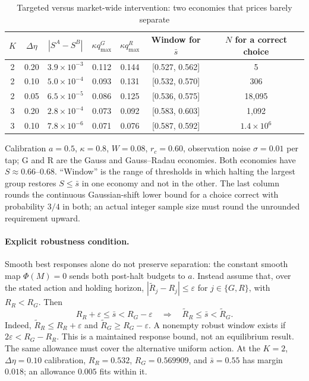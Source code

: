 \documentclass[12pt]{article}
\theoremstyle{definition}
\theoremstyle{remark}
\begin{document}
\begin{table}[!htbp]\centering\footnotesize
\begin{threeparttable}
\caption{Targeted versus market-wide intervention: two economies that prices barely separate}\label{tab:target}
\setlength{\tabcolsep}{3pt}
\begin{tabular}{ccccccc}
\toprule
$K$ & $\Delta\eta$ & $|S^A-S^B|$ & $\kappa q^{G}_{\max}$ & $\kappa q^{R}_{\max}$ & Window for $\bar s$ & $N$ for a correct choice\\
\midrule
2 & 0.20 & $3.9\times10^{-3}$ & 0.112 & 0.144 & [0.527, 0.562] & 5\\
2 & 0.10 & $5.0\times10^{-4}$ & 0.093 & 0.131 & [0.532, 0.570] & 306\\
2 & 0.05 & $6.5\times10^{-5}$ & 0.086 & 0.125 & [0.536, 0.575] & 18{,}095\\
3 & 0.20 & $2.8\times10^{-4}$ & 0.073 & 0.092 & [0.583, 0.603] & 1{,}092\\
3 & 0.10 & $7.8\times10^{-6}$ & 0.071 & 0.076 & [0.587, 0.592] & $1.4\times10^{6}$\\
\bottomrule
\end{tabular}
\begin{tablenotes}\footnotesize\item Calibration $a=0.5$, $\kappa=0.8$, $W=0.08$, $r_c=0.60$, observation noise $\sigma=0.01$ per tap; G and R are the Gauss and Gauss--Radau economies. Both economies have $S\approx0.66$--$0.68$. ``Window'' is the range of thresholds in which halting the largest group restores $S\le\bar s$ in one economy and not in the other. The last column rounds the continuous Gaussian-shift lower bound for a choice correct with probability $3/4$ in both; an actual integer sample size must round the unrounded requirement upward.\end{tablenotes}
\end{threeparttable}
\end{table}

\paragraph{Explicit robustness condition.} Smooth best responses alone do not preserve separation: the constant smooth map $\Phi(M)=0$ sends both post-halt budgets to $a$. Instead assume that, over the stated action and holding horizon, $|\widetilde R_j-R_j|\le\varepsilon$ for $j\in\{G,R\}$, with $R_R<R_G$. Then
\begin{equation}\label{eq:reopt_gap}
 R_R+\varepsilon\le\bar s<R_G-\varepsilon
 \quad\Longrightarrow\quad \widetilde R_R\le\bar s<\widetilde R_G.
\end{equation}
Indeed, $\widetilde R_R\le R_R+\varepsilon$ and $\widetilde R_G\ge R_G-\varepsilon$. A nonempty robust window exists if $2\varepsilon<R_G-R_R$. This is a maintained response bound, not an equilibrium result. The same allowance must cover the alternative uniform action. At the $K=2$, $\Delta\eta=0.10$ calibration, $R_R=0.532$, $R_G=0.569909$, and $\bar s=0.55$ has margin $0.018$; an allowance $0.005$ fits within it.
\end{document}
